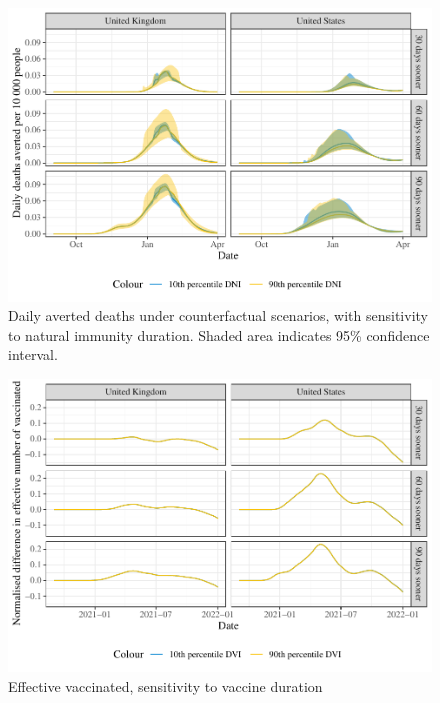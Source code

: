 \documentclass{article}
\begin{document}
\begin{figure}[H]

{\centering \includegraphics[height=0.35\textheight,]{_main_files/figure-latex/deaths-averted-plot-durR-1}

}

\caption{Daily averted deaths under counterfactual scenarios, with sensitivity to natural immunity duration. Shaded area indicates 95\% confidence interval.}\label{fig:deaths-averted-plot-durR}
\end{figure}
\begin{figure}[H]

{\centering \includegraphics[height=0.35\textheight,]{_main_files/figure-latex/vaccinated-plot-vei-1}

}

\caption{Effective vaccinated, sensitivity to vaccine duration}\label{fig:vaccinated-plot-vei}
\end{figure}
\end{document}
